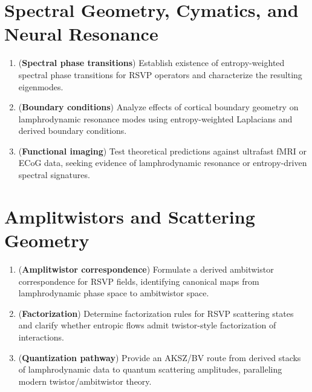 \documentclass[12pt]{article}
\theoremstyle{plain}
\theoremstyle{definition}
\theoremstyle{remark}
\begin{document}
\section{Spectral Geometry, Cymatics, and Neural Resonance}

\begin{enumerate}
    \item ({\bf Spectral phase transitions})
    Establish existence of entropy-weighted spectral phase transitions for
    RSVP operators and characterize the resulting eigenmodes.

    \item ({\bf Boundary conditions})
    Analyze effects of cortical boundary geometry on lamphrodynamic resonance
    modes using entropy-weighted Laplacians and derived boundary conditions.

    \item ({\bf Functional imaging})
    Test theoretical predictions against ultrafast fMRI or ECoG data, seeking
    evidence of lamphrodynamic resonance or entropy-driven spectral signatures.
\end{enumerate}


\section{Amplitwistors and Scattering Geometry}

\begin{enumerate}
    \item ({\bf Amplitwistor correspondence})
    Formulate a derived ambitwistor correspondence for RSVP fields, identifying
    canonical maps from lamphrodynamic phase space to ambitwistor space.

    \item ({\bf Factorization})
    Determine factorization rules for RSVP scattering states and clarify whether
    entropic flows admit twistor-style factorization of interactions.

    \item ({\bf Quantization pathway})
    Provide an AKSZ/BV route from derived stacks of lamphrodynamic data to
    quantum scattering amplitudes, paralleling modern twistor/ambitwistor theory.
\end{enumerate}
\end{document}
